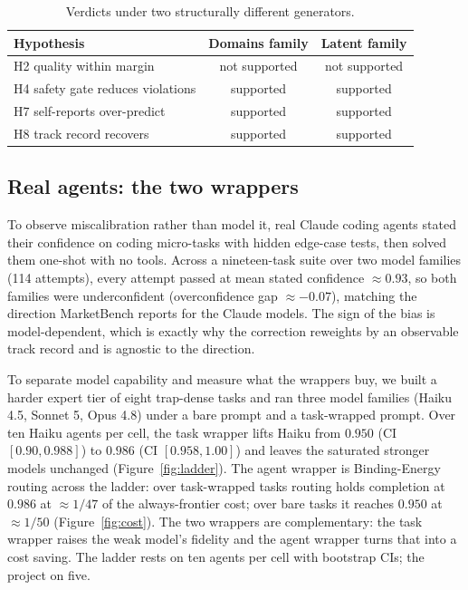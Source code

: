 \documentclass[11pt]{article}
\begin{document}
\begin{table}[h]
\centering\small
\caption{Verdicts under two structurally different generators.}
\label{tab:robust}
\begin{tabular}{@{}lcc@{}}
\toprule
\textbf{Hypothesis} & \textbf{Domains family} & \textbf{Latent family} \\
\midrule
H2 quality within margin & not supported & not supported \\
H4 safety gate reduces violations & supported & supported \\
H7 self-reports over-predict & supported & supported \\
H8 track record recovers & supported & supported \\
\bottomrule
\end{tabular}
\end{table}

\subsection{Real agents: the two wrappers}
To observe miscalibration rather than model it, real Claude coding agents stated their confidence on coding micro-tasks with hidden edge-case tests, then solved them one-shot with no tools. Across a nineteen-task suite over two model families (114 attempts), every attempt passed at mean stated confidence $\approx 0.93$, so both families were underconfident (overconfidence gap $\approx -0.07$), matching the direction MarketBench reports for the Claude models. The sign of the bias is model-dependent, which is exactly why the correction reweights by an observable track record and is agnostic to the direction.

To separate model capability and measure what the wrappers buy, we built a harder expert tier of eight trap-dense tasks and ran three model families (Haiku 4.5, Sonnet 5, Opus 4.8) under a bare prompt and a task-wrapped prompt. Over ten Haiku agents per cell, the task wrapper lifts Haiku from $0.950$ (CI $[0.90,0.988]$) to $0.986$ (CI $[0.958,1.00]$) and leaves the saturated stronger models unchanged (Figure~\ref{fig:ladder}). The agent wrapper is Binding-Energy routing across the ladder: over task-wrapped tasks routing holds completion at $0.986$ at $\approx 1/47$ of the always-frontier cost; over bare tasks it reaches $0.950$ at $\approx 1/50$ (Figure~\ref{fig:cost}). The two wrappers are complementary: the task wrapper raises the weak model's fidelity and the agent wrapper turns that into a cost saving. The ladder rests on ten agents per cell with bootstrap CIs; the project on five.
\end{document}

